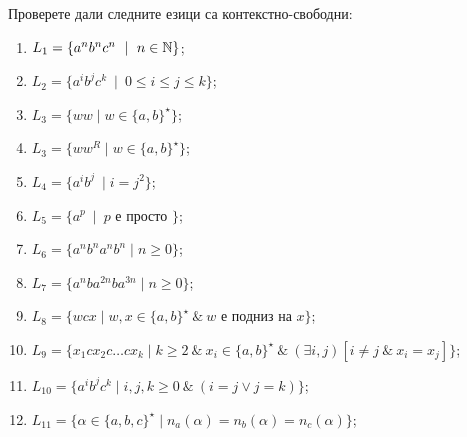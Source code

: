 \begin{problem}
  Проверете дали следните езици са контекстно-свободни:
  \begin{enumerate}
  \item
    $L_1 = \{a^nb^nc^n\ \mid\ n\in\N\}$;
  \item
    $L_2 = \{a^ib^jc^k\ \mid\ 0 \leq i \leq j \leq k\}$;
  \item
    $L_3 = \{ww\mid w\in \{a,b\}^\star\}$;
  \item
    $L_3 = \{ww^R\mid w\in \{a,b\}^\star\}$;
  \item
    $L_4 = \{a^ib^j\ \mid i = j^2\}$;
  \item
    $L_5 = \{a^p\ \mid\ p\mbox{ е просто }\}$;
  \item
    $L_6 = \{a^nb^na^nb^n\mid n\geq 0\}$;
  \item
    $L_7 = \{a^n b a^{2n} b a^{3n}\mid n\geq 0\}$;
  \item
    $L_8 = \{w c x\mid w,x\in \{a,b\}^\star\ \&\ w\mbox{ е подниз на }x\}$;
  \item
    $L_9 = \{x_1 c x_2 c \dots c x_k\mid k\geq 2\ \&\ x_i\in\{a,b\}^\star\ \&\ (\exists i,j)[i \neq j\ \&\ x_i = x_j]\}$;
  \item
    $L_{10} = \{a^ib^jc^k\mid i,j,k\geq 0\ \&\ (i = j \vee j = k)\}$;
  \item
    $L_{11} = \{\alpha \in \{a,b,c\}^\star\mid n_a(\alpha) = n_b(\alpha) = n_c(\alpha)\}$;
  \end{enumerate}
\end{problem}
